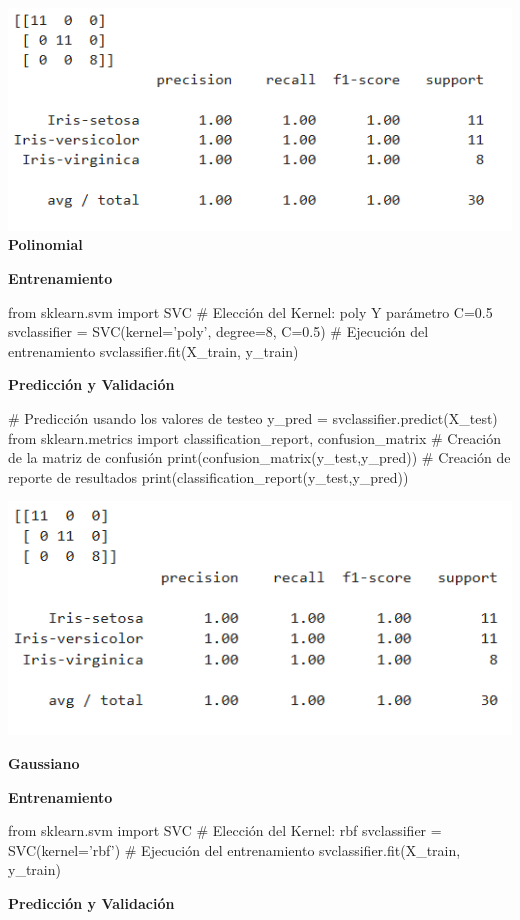 \documentclass[paper=a4, fontsize=11pt]{scrartcl}
\numberwithin{equation}{section}		%
\numberwithin{figure}{section}			%
\numberwithin{table}{section}				%
\begin{document}
\begin{enumerate}
    \includegraphics[scale=0.8]{df2_results_linear}
    \newpage
    \textbf{Polinomial}
    
    \textbf{Entrenamiento}
    
    \begin{python}
    from sklearn.svm import SVC
    # Elección del Kernel: poly Y parámetro C=0.5
    svclassifier = SVC(kernel='poly', degree=8, C=0.5)
    # Ejecución del entrenamiento
    svclassifier.fit(X_train, y_train)
    \end{python}
    
    \textbf{Predicción y Validación}
    
    \begin{python}
    # Predicción usando los valores de testeo
    y_pred = svclassifier.predict(X_test)
    from sklearn.metrics import classification_report, confusion_matrix
    # Creación de la matriz de confusión
    print(confusion_matrix(y_test,y_pred))
    # Creación de reporte de resultados
    print(classification_report(y_test,y_pred))
    \end{python}
    
    \includegraphics[scale=0.8]{df2_results_poly}
    
    \textbf{Gaussiano}
    
    \textbf{Entrenamiento}
    
    \begin{python}
    from sklearn.svm import SVC
    # Elección del Kernel: rbf
    svclassifier = SVC(kernel='rbf')
    # Ejecución del entrenamiento
    svclassifier.fit(X_train, y_train)
    \end{python}
    \newpage
    \textbf{Predicción y Validación}
    

\end{enumerate}
\end{document}
